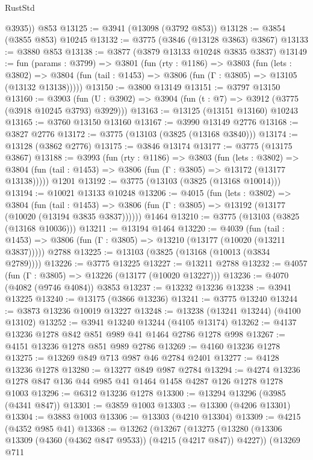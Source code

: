 \begin{lexlean}{RustStd}
\begin{coremodule}
{\begin{coremodule}
{{{{{{{{{{{{{{{{{{{{{{{{{{{{{{{        @3935))
    @853
@13125 := @3941 (@13098 (@3792 @853))
@13128 := @3854 (@3855 @853) @10245
@13132 := @3775 (@3846 (@13128 @3863) @3867)
@13133 := @3880 @853
@13138 := @3877 (@3879 @13133 @10248 @3835 @3837)
@13149 := fun (params : @3799) =>
  @3801
    (fun (rty : @1186) =>
    @3803
      (fun (lets : @3802) =>
      @3804 (fun (tail : @1453) => @3806 (fun (Γ : @3805) => @13105 (@13132 @13138)))))
@13150 := @3800 @13149
@13151 := @3797 @13150
@13160 := @3903
    (fun (U : @3902) => @3904 (fun (t : @7) => @3912 (@3775 (@3918 @10245 @3793) @3929)))
@13163 := @13125 (@13151 @13160) @10243
@13165 := @3760 @13150 @13160
@13167 := @3990 @13149 @2776
@13168 := @3827 @2776
@13172 := @3775 (@13103 (@3825 (@13168 @3840)))
@13174 := @13128 (@3862 @2776)
@13175 := @3846 @13174
@13177 := @3775 (@13175 @3867)
@13188 := @3993
    (fun (rty : @1186) =>
    @3803
      (fun (lets : @3802) =>
      @3804 (fun (tail : @1453) => @3806 (fun (Γ : @3805) => @13172 (@13177 @13138)))))
    @1201
@13192 := @3775 (@13103 (@3825 (@13168 @10014)))
@13194 := @10021 @13133 @10248
@13206 := @4015
    (fun (lets : @3802) =>
    @3804
      (fun (tail : @1453) =>
      @3806 (fun (Γ : @3805) => @13192 (@13177 (@10020 (@13194 @3835 @3837))))))
    @1464
@13210 := @3775 (@13103 (@3825 (@13168 @10036)))
@13211 := @13194 @1464
@13220 := @4039
    (fun (tail : @1453) => @3806 (fun (Γ : @3805) => @13210 (@13177 (@10020 (@13211 @3837)))))
    @2788
@13225 := @13103 (@3825 (@13168 (@10013 (@3834 @2789))))
@13226 := @3775 @13225
@13227 := @13211 @2788
@13232 := @4057 (fun (Γ : @3805) => @13226 (@13177 (@10020 @13227)))
@13236 := @4070 (@4082 (@9746 @4084)) @3853
@13237 := @13232 @13236
@13238 := @3941 @13225
@13240 := @13175 (@3866 @13236)
@13241 := @3775 @13240
@13244 := @3873 @13236 @10019 @13227
@13248 := @13238 (@13241 @13244) (@4100 @13102)
@13252 := @3941 @13240 @13244 (@4105 @13174)
@13262 := @4137 @13236 @1278 @842 @851 @989 @41 @1464 @2786 @1278 @998
@13267 := @4151 @13236 @1278 @851 @989 @2786
@13269 := @4160 @13236 @1278
@13275 := @13269 @849 @713 @987 @46 @2784 @2401
@13277 := @4128 @13236 @1278
@13280 := @13277 @849 @987 @2784
@13294 := @4274 @13236 @1278 @847 @136 @44 @985 @41 @1464 @1458 @4287 @126 @1278 @1278 @1003
@13296 := @6312 @13236 @1278
@13300 := @13294 @13296 (@3985 (@4341 @847))
@13301 := @3859 @1003
@13303 := @13300 (@4206 @13301)
@13304 := @3883 @1003
@13306 := @13303 (@4210 @13304)
@13309 := @4215 (@4352 @985 @41)
@13368 := @13262
    (@13267
      (@13275
        (@13280 (@13306 @13309 (@4360 (@4362 @847 @9533)) (@4215 (@4217 @847)) @4227))
        (@13269
          @711
}}}}}}}}}}}}}}}}}}}}}}}}}}}}}}}
\end{coremodule}}
\end{coremodule}
\end{lexlean}
